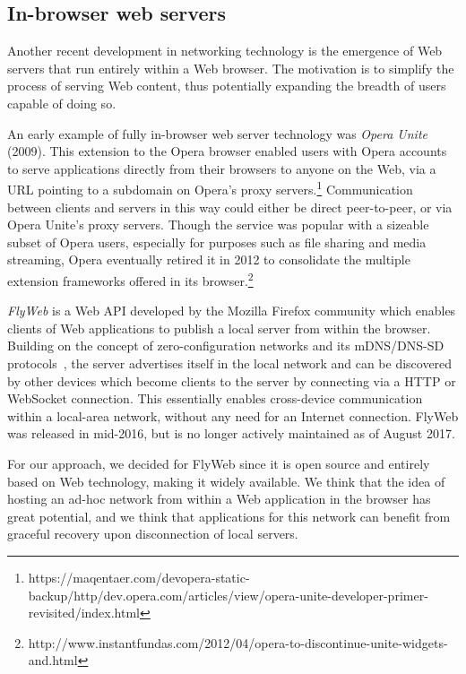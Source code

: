 \subsection{In-browser web servers}
\label{sec:in_browser_servers}

Another recent development in networking technology is the emergence of Web servers that run entirely within a Web browser. 
The motivation is to simplify the process of serving Web content, thus potentially expanding the breadth of users capable of doing so.

An early example of fully in-browser web server technology was \textit{Opera Unite} (2009).
This extension to the Opera browser enabled users with Opera accounts to serve applications directly from their browsers to anyone on the Web, via a URL pointing to a subdomain on Opera's proxy servers.\footnote{https://maqentaer.com/devopera-static-backup/http/dev.opera.com/articles/view/opera-unite-developer-primer-revisited/index.html}
Communication between clients and servers in this way could either be direct peer-to-peer, or via Opera Unite's proxy servers.
Though the service was popular with a sizeable subset of Opera users, especially for purposes such as file sharing and media streaming, Opera eventually retired it in 2012 to consolidate the multiple extension frameworks offered in its browser.\footnote{http://www.instantfundas.com/2012/04/opera-to-discontinue-unite-widgets-and.html}

\textit{FlyWeb} is a Web API developed by the Mozilla Firefox community which enables clients of Web applications to publish a local server from within the browser.
Building on the concept of zero-configuration networks and its mDNS/DNS-SD protocols~\cite{rfc6762, rfc6763}, the server advertises itself in the local network and can be discovered by other devices which become clients to the server by connecting via a HTTP or WebSocket connection.
This essentially enables cross-device communication within a local-area network, without any need for an Internet connection.
FlyWeb was released in mid-2016, but is no longer actively maintained as of August 2017.

For our approach, we decided for FlyWeb since it is open source and entirely based on Web technology, making it widely available.
We think that the idea of hosting an ad-hoc network from within a Web application in the browser has great potential, and we think that applications for this network can benefit from graceful recovery upon disconnection of local servers.